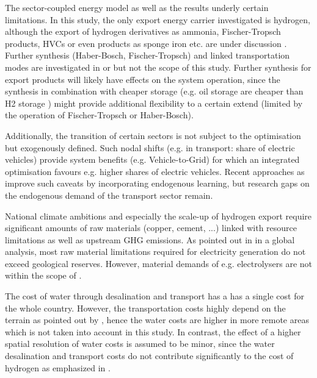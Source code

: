 The sector-coupled energy model as well as the results underly certain limitations. In this study, the only export energy carrier investigated is hydrogen, although the export of hydrogen derivatives as ammonia, Fischer-Tropsch products, HVCs or even products as sponge iron etc. are under discussion \cite{Verpoort2023}. Further synthesis (Haber-Bosch, Fischer-Tropsch) and linked transportation modes are investigated in \cite{Hampp2021} or \cite{Galimova2023} but not the scope of this study. Further synthesis for export products will likely have effects on the system operation, since the synthesis in combination with cheaper storage (e.g. oil storage are cheaper than H2 storage \cite{DEA2019TechnologyData}) might provide additional flexibility to a certain extend (limited by the operation of Fischer-Tropsch or Haber-Bosch).

Additionally, the transition of certain sectors is not subject to the optimisation but exogenously defined. Such nodal shifts (e.g. in transport: share of electric vehicles) provide system benefits (e.g. Vehicle-to-Grid) for which an integrated optimisation favours e.g. higher shares of electric vehicles.
Recent approaches as \cite{Zeyen2023} improve such caveats by incorporating endogenous learning, but research gaps on the endogenous demand of the transport sector remain.

National climate ambitions and especially the scale-up of hydrogen export require significant amounts of raw materials (copper, cement, ...) linked with resource limitations as well as upstream GHG emissions. As pointed out in \cite{Wang2023} in a global analysis, most raw material limitations required for electricity generation do not exceed geological reserves. However, material demands of e.g. electrolysers are not within the scope of \cite{Wang2023}.

The cost of water through desalination and transport has a 
has a single cost for the whole country. However, the transportation costs highly depend on the terrain as pointed out by \cite{Caldera2016}, hence the water costs are higher in more remote areas which is not taken into account in this study. In contrast, the effect of a higher spatial resolution of water costs is assumed to be minor, since the water desalination and transport costs do not contribute significantly to the cost of hydrogen as emphasized in \cite{Hampp2023}. %



